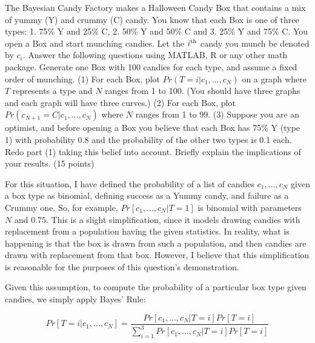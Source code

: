 \documentclass[fleqn]{homework}
\begin{document}
  \maketitle

  \begin{problem}{1}
    \begin{question}
      The Bayesian Candy Factory makes a Halloween Candy Box that contains a mix
      of yummy (Y) and crummy (C) candy. You know that each Box is one of three
      types: 1. 75\% Y and 25\% C, 2.  50\% Y and 50\% C and 3. 25\% Y and 75\%
      C. You open a Box and start munching candies. Let the
      $i\textsuperscript{th}$ candy you munch be denoted by $c_i$. Answer the
      following questions using MATLAB, R or any other math package. Generate
      one Box with 100 candies for each type, and assume a fixed order of
      munching. (1) For each Box, plot $Pr(T=i|c_1,\dots,c_N)$ on a graph where
      $T$ represents a type and $N$ ranges from 1 to 100. (You should have three
      graphs and each graph will have three curves.) (2) For each Box, plot
      $Pr(c_{N+1}=C|c_1,\dots,c_N)$ where $N$ ranges from 1 to 99. (3) Suppose
      you are an optimist, and before opening a Box you believe that each Box
      has 75\% Y (type 1) with probability 0.8 and the probability of the other
      two types is 0.1 each. Redo part (1) taking this belief into
      account. Briefly explain the implications of your results. (15 points)
    \end{question}

    For this situation, I have defined the probability of a list of candies
    $c_1, \dots, c_N$ given a box type as binomial, defining success as a Yummy
    candy, and failure as a Crummy one.  So, for example,
    $Pr[c_1, \dots, c_N|T=1]$ is binomial with parameters $N$ and $0.75$.  This
    is a slight simplification, since it models drawing candies with replacement
    from a population having the given statistics.  In reality, what is
    happening is that the box is drawn from such a population, and then candies
    are drawn with replacement from that box.  However, I believe that this
    simplification is reasonable for the purposes of this question's
    demonstration.

    Given this assumption, to compute the probability of a particular box type
    given candies, we simply apply Bayes' Rule:

    \begin{equation}
      Pr[T=i | c_1, \dots, c_N] = \frac{Pr[c_1, \dots, c_N | T=i] Pr[T=i]}{\sum_{i=1}^3 Pr[c_1, \dots, c_N|T=i] Pr[T=i]}
    \end{equation}


\end{problem}
\end{document}
